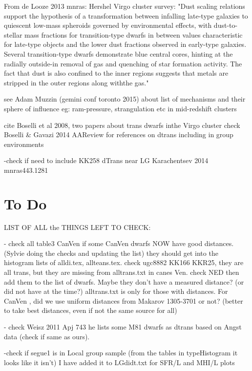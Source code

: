 \documentclass[12pt,preprint]{emulateapj}
\begin{document}
From de Looze 2013 mnras: Hershel Virgo cluster survey: "Dust scaling relations support the hypothesis of a transformation 
between infalling late-type galaxies to quiescent low-mass spheroids governed by environmental effects, with 
dust-to-stellar mass fractions for transition-type dwarfs in between values characteristic for late-type objects and 
the lower dust fractions observed in early-type galaxies. Several transition-type dwarfs demonstrate blue central cores, 
hinting at the radially outside-in removal of gas and quenching of star formation activity. The fact that dust is also 
confined to the inner regions suggests that metals are stripped in the outer regions along withthe gas."

see Adam Muzzin (gemini conf toronto 2015) about list of mechanisms and their sphere of influence eg: ram-pressure, strangulation etc in mid-redshift clusters

cite Boselli et al 2008, two papers about trans dwarfs inthe Virgo cluster
check Boselli & Gavazi 2014 AAReview for references on dtrans including in group environments

-check if need to include KK258 dTrans near LG Karachentsev 2014 mnras443.1281


\section{To Do}

LIST OF ALL the THINGS LEFT TO CHECK:

- check all table3 CanVen if some CanVen dwarfs NOW have good distances. (Sylvie doing the checks and updating the list) they should get into 
the histogram lists of alldi.tex, allteans.tex. check ugc8882 KK166 KKR25, they are all trans, but they are missing from alltrans.txt in canes Ven. 
check NED then add them to the list of dwarfs. Maybe they don't have a measured distance? (or did not have at the time?) alltrans.txt is only for 
those with distances. For CanVen , did we use uniform distances from Makarov 1305-3701 or not? (better to take best distances, even if not the 
same source for all)

- check Weisz 2011 Apj 743 he lists some M81 dwarfs as dtrans based on Angst data (check if same as ours).

-check if segue1 is in Local group sample (from the tables in typeHistogram it looks like it isn't)
I have added it to LGdidt.txt for SFR/L and MHI/L plots
\end{document}
